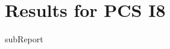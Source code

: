 \renewcommand{\DTRPcs}{I8} %
\renewcommand{\DTRPcsLong}{I8}


    \section{Results for PCS \DTRPcsLong}

    {{subReport}}
    \newpage


